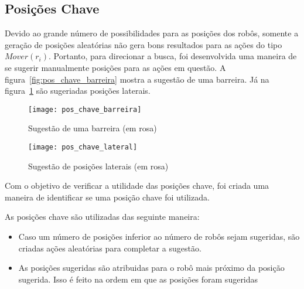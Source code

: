 \subsection{Posições Chave}\label{subsec:pos_chave}

Devido ao grande número de possibilidades para
as posições dos robôs, somente a geração de
posições aleatórias não gera bons resultados
para as ações do tipo $Mover(r_i)$. Portanto,
para direcionar a busca, foi desenvolvida uma
maneira de se sugerir manualmente posições para
as ações em questão. A figura~\ref{fig:pos_chave_barreira}
mostra a sugestão de uma barreira. Já na
figura~\ref{fig:pos_chave_lateral} são sugeriadas
posições laterais. 

\begin{figure}[H]
  \centering
  \texttt{[image: pos\_chave\_barreira]}
  \caption{Sugestão de uma barreira (em rosa)}\label{fig:pos_chave_barreira}
  \texttt{[image: pos\_chave\_lateral]}
  \caption{Sugestão de posições laterais (em rosa)}\label{fig:pos_chave_lateral}
\end{figure}

Com o objetivo de verificar a utilidade das posições chave,
foi criada uma maneira de identificar se uma posição chave
foi utilizada.

As posições chave são utilizadas das seguinte maneira:
\begin{itemize}
  \item Caso um número de posições inferior ao número de
        robôs sejam sugeridas, são criadas ações aleatórias
        para completar a sugestão. 
  \item As posições sugeridas são atribuidas para o robô
        mais próximo da posição sugerida. Isso é feito
        na ordem em que as posições foram sugeridas
\end{itemize}
